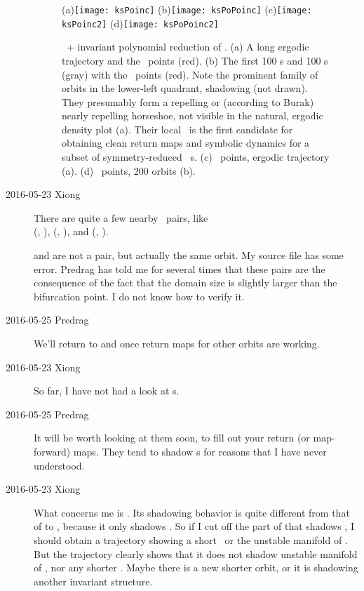 \begin{description}
\begin{figure} %
  \centering
  (a)\texttt{[image: ksPoinc]}
  (b)\texttt{[image: ksPoPoinc]}
  (c)\texttt{[image: ksPoinc2]}
  (d)\texttt{[image: ksPoPoinc2]}
  \caption{
    \SFslice\ + invariant polynomial  reduction of .
    (a) A long ergodic trajectory and the \PoincSec\ points
    (red).
    (b) The first 100 \ppo s and 100 \rpo s (gray) with the \PoincSec\
    points (red). Note the prominent family of orbits in the lower-left
    quadrant, shadowing
     (not drawn). They presumably form a repelling or (according
    to Burak) nearly repelling horseshoe, not visible in the natural, ergodic
    density plot (a). Their local \PoincSec\ is the first candidate
    for obtaining clean return maps and symbolic dynamics for a
    subset of symmetry-reduced \statesp\ \po s.
    (c) \PoincSec\ points, ergodic trajectory (a).
    (d) \PoincSec\ points, 200 orbits (b).
  }
  \label{fig:ksPoinc}
\end{figure}

\item[2016-05-23 Xiong]
  There are quite a few nearby \rpo\ pairs, like \\
  (, ),
  (, ), and (, ).

   and  are not a pair, but actually the same orbit.
  My source file has some error. Predrag has told me for several times
  that these pairs are the consequence of the fact that the
  domain size is slightly larger than the bifurcation point. I do not
  know how to verify it.

\item[2016-05-25 Predrag]
  We'll return to  and  once return maps for other orbits
  are working.

\item[2016-05-23 Xiong]
  So far, I have not had a look at \ppo s.

\item[2016-05-25 Predrag]
  It will be worth looking at them soon, to fill out your return (or
  map-forward) maps. They tend to shadow \rpo s for reasons that I have
  never understood.

\item[2016-05-23 Xiong]
  What concerns me is . Its shadowing behavior is quite different
  from that of \RPO{20} to \RPO{30}, because it only shadows . So
  if I cut off the part of \RPO{26} that shadows \RPO{1}, I should obtain
  a trajectory showing a short \rpo\ or the unstable manifold of . But
  the trajectory clearly shows that it does not shadow unstable manifold
  of \EQV{2}, nor any shorter \rpo. Maybe there is a new shorter orbit, or it
  is shadowing another invariant structure.


\end{description}
